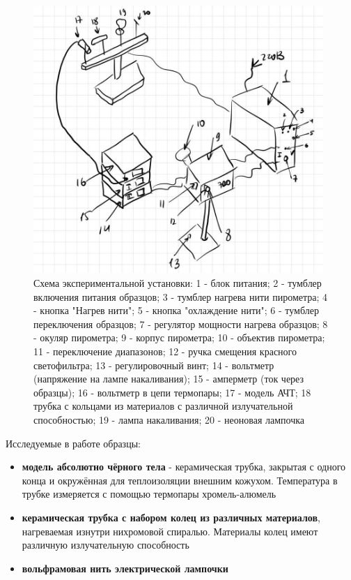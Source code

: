 \documentclass[a4paper, 12pt]{article}%
\begin{document}
\begin{figure}[!h]
    \centering
    \includegraphics[width=11cm]{fig2.png}
    \caption{Схема экспериментальной установки: 1 - блок питания; 2 - тумблер включения питания образцов; 3 - тумблер нагрева нити пирометра; 4 - кнопка "Нагрев нити"; 5 - кнопка "охлаждение нити"; 6 - тумблер переключения образцов; 7 - регулятор мощности нагрева образцов; 8 - окуляр пирометра; 9 - корпус пирометра; 10 - объектив пирометра; 11 - переключение диапазонов; 12 - ручка смещения красного светофильтра; 13 - регулировочный винт; 14 - вольтметр (напряжение на лампе накаливания); 15 - амперметр (ток через образцы); 16 - вольтметр в цепи термопары; 17 - модель АЧТ; 18 трубка с кольцами из материалов с различной излучательной способностью; 19 - лампа накаливания; 20 - неоновая лампочка}
    \label{fig:vac}
\end{figure}

Исследуемые в работе образцы:
\begin{itemize}
    \item \textbf{модель абсолютно чёрного тела} - керамическая трубка, закрытая с одного конца и окружённая для теплоизоляции внешним кожухом. Температура в трубке измеряется с помощью термопары хромель-алюмель
    \item \textbf{керамическая трубка с набором колец из различных материалов}, нагреваемая изнутри нихромовой спиралью. Материалы колец имеют различную излучательную способность
    \item \textbf{вольфрамовая нить электрической лампочки}
\end{itemize}
\end{document}
